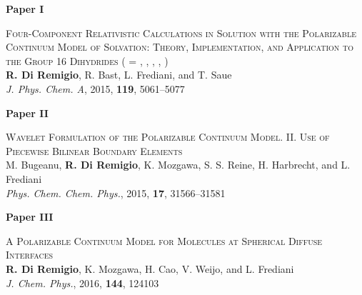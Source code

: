 \thispagestyle{empty}
\vspace*{\fill}
\begin{flushright}
{\Huge\textbf{Paper I}}
\end{flushright}

{\Large
\textsc{Four-Component Relativistic Calculations in Solution with the
Polarizable Continuum Model of Solvation: Theory,
Implementation, and Application to the
Group 16 Dihydrides
 ( = , , , ,
    )}
\\
\textbf{R. Di Remigio}, R. Bast, L. Frediani, and T. Saue
\\
\textit{J. Phys. Chem. A}, \textrm{2015}, \textbf{119}, 5061--5077
}
\vspace*{\fill}



\thispagestyle{empty}
\vspace*{\fill}
\begin{flushright}
{\Huge\textbf{Paper II}}
\end{flushright}

{\Large
\textsc{
Wavelet Formulation of the Polarizable Continuum Model. II. Use of Piecewise
Bilinear Boundary Elements
}
\\
M. Bugeanu, \textbf{R. Di Remigio}, K. Mozgawa, S. S. Reine, H.
Harbrecht,  and L. Frediani
\\
\textit{Phys. Chem. Chem. Phys.}, \textrm{2015}, \textbf{17},
31566--31581
}
\vspace*{\fill}



\thispagestyle{empty}
\vspace*{\fill}
\begin{flushright}
{\Huge\textbf{Paper III}}
\end{flushright}

{\Large
\textsc{
    A Polarizable Continuum Model for Molecules at Spherical
    Diffuse Interfaces
}
\\
    \textbf{R. Di Remigio}, K. Mozgawa, H. Cao, V. Weijo, and L.
    Frediani
\\
    \textit{J. Chem. Phys.}, \textrm{2016}, \textbf{144}, 124103
}
\vspace*{\fill}

